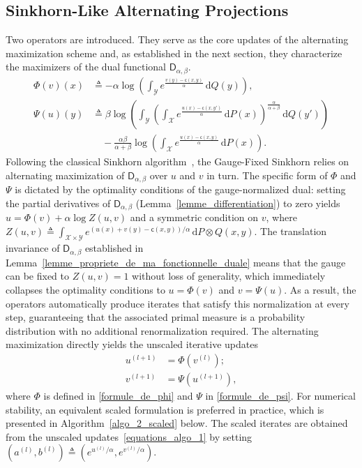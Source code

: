 \documentclass{article}
\begin{document}
\subsection{Sinkhorn-Like Alternating Projections}
\label{section_sinkhorn_alternating}

Two operators are introduced. They serve as the core updates of the alternating
maximization scheme and, as established in the next section, they characterize the
maximizers of the dual functional $\mathsf{D}_{\alpha,\beta}$.
\begin{align}
\label{formule_de_phi}
\Phi(v)(x)
&\triangleq
-\alpha\log\left(
\int_{\mathcal{Y}}
e^{\frac{v(y)-\mathsf{c}(x,y)}{\alpha}}
\,\mathrm{d}Q(y)
\right),  \\
\label{formule_de_psi}
\Psi(u)(y)
&\triangleq
\beta\log\left(
\int_{\mathcal{Y}}
\left(
\int_{\mathcal{X}}
e^{\frac{u(x)-\mathsf{c}(x,y')}{\alpha}}
\,\mathrm{d}P(x)
\right)^{\frac{\alpha}{\alpha+\beta}}
\,\mathrm{d}Q(y')
\right)
\nonumber \\
&\quad
-
\frac{\alpha\beta}{\alpha+\beta}
\log\left(
\int_{\mathcal{X}}
e^{\frac{u(x)-\mathsf{c}(x,y)}{\alpha}}
\,\mathrm{d}P(x)
\right).
\end{align}
Following the classical Sinkhorn algorithm~\cite{cuturi2013sinkhorndistanceslightspeedcomputation},
the Gauge-Fixed Sinkhorn relies on alternating maximization of $\mathsf{D}_{\alpha,\beta}$
over $u$ and $v$ in turn. The specific form of $\Phi$ and $\Psi$ is dictated by the
optimality conditions of the gauge-normalized dual: setting the partial derivatives of
$\mathsf{D}_{\alpha,\beta}$ (Lemma~\ref{lemme_differentiation}) to zero yields $u =
\Phi(v) + \alpha\log Z(u,v)$ and a symmetric condition on $v$, where $Z(u,v) \triangleq
\int_{\mathcal{X}\times\mathcal{Y}} e^{(u(x)+v(y)-\mathsf{c}(x,y))/\alpha}\,\mathrm{d}P\otimes Q(x,y)$.
The translation invariance of $\mathsf{D}_{\alpha,\beta}$ established in
Lemma~\ref{lemme_propriete_de_ma_fonctionnelle_duale} means that the gauge can be fixed
to $Z(u,v) = 1$ without loss of generality, which immediately collapses the optimality
conditions to $u = \Phi(v)$ and $v = \Psi(u)$. As a result, the operators
automatically produce iterates that satisfy this normalization at every step,
guaranteeing that the associated primal measure is a probability distribution with no
additional renormalization required. The alternating maximization directly yields the unscaled iterative updates
\begin{subequations}
  \label{equations_algo_1}
  \begin{align}
    \label{update_unscaled_u}
    u^{(l+1)} &= \Phi(v^{(l)}); \\
    \label{update_unscaled_v}
    v^{(l+1)} &= \Psi(u^{(l+1)}),
  \end{align}
\end{subequations}
where $\Phi$ is defined in \eqref{formule_de_phi} and $\Psi$ in \eqref{formule_de_psi}. For numerical stability, an equivalent scaled formulation is preferred in practice, which is presented in Algorithm~\ref{algo_2_scaled} below. The scaled iterates are obtained from the unscaled updates~\eqref{equations_algo_1} by setting $(a^{(l)}, b^{(l)}) \triangleq (e^{u^{(l)}/\alpha}, e^{v^{(l)}/\alpha})$.
\end{document}
